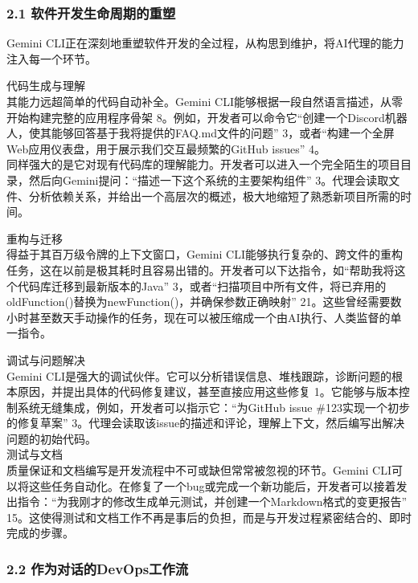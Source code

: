 \documentclass[a4paper,12pt]{article}
\begin{document}
\begin{multicols}{2}
    \subsubsection{\texorpdfstring{\textbf{2.1
    软件开发生命周期的重塑}}{2.1 软件开发生命周期的重塑}}\label{ux8f6fux4ef6ux5f00ux53d1ux751fux547dux5468ux671fux7684ux91cdux5851}

    Gemini
    CLI正在深刻地重塑软件开发的全过程，从构思到维护，将AI代理的能力注入每一个环节。

    代码生成与理解\\
    其能力远超简单的代码自动补全。Gemini
    CLI能够根据一段自然语言描述，从零开始构建完整的应用程序骨架
    8。例如，开发者可以命令它``创建一个Discord机器人，使其能够回答基于我将提供的FAQ.md文件的问题''
    3，或者``构建一个全屏Web应用仪表盘，用于展示我们交互最频繁的GitHub
    issues'' 4。\\
    同样强大的是它对现有代码库的理解能力。开发者可以进入一个完全陌生的项目目录，然后向Gemini提问：``描述一下这个系统的主要架构组件''
    3。代理会读取文件、分析依赖关系，并给出一个高层次的概述，极大地缩短了熟悉新项目所需的时间。

    重构与迁移\\
    得益于其百万级令牌的上下文窗口，Gemini
    CLI能够执行复杂的、跨文件的重构任务，这在以前是极其耗时且容易出错的。开发者可以下达指令，如``帮助我将这个代码库迁移到最新版本的Java''
    3，或者``扫描项目中所有文件，将已弃用的\\
    oldFunction()替换为newFunction()，并确保参数正确映射''
    21。这些曾经需要数小时甚至数天手动操作的任务，现在可以被压缩成一个由AI执行、人类监督的单一指令。

    调试与问题解决\\
    Gemini
    CLI是强大的调试伙伴。它可以分析错误信息、堆栈跟踪，诊断问题的根本原因，并提出具体的代码修复建议，甚至直接应用这些修复
    1。它能够与版本控制系统无缝集成，例如，开发者可以指示它：``为GitHub
    issue \#123实现一个初步的修复草案''
    3。代理会读取该issue的描述和评论，理解上下文，然后编写出解决问题的初始代码。\\
    测试与文档\\
    质量保证和文档编写是开发流程中不可或缺但常常被忽视的环节。Gemini
    CLI可以将这些任务自动化。在修复了一个bug或完成一个新功能后，开发者可以接着发出指令：``为我刚才的修改生成单元测试，并创建一个Markdown格式的变更报告''
    15。这使得测试和文档工作不再是事后的负担，而是与开发过程紧密结合的、即时完成的步骤。

    \subsubsection{\texorpdfstring{\textbf{2.2
    作为对话的DevOps工作流}}{2.2 作为对话的DevOps工作流}}\label{ux4f5cux4e3aux5bf9ux8bddux7684devopsux5de5ux4f5cux6d41}


\end{multicols}
\end{document}
